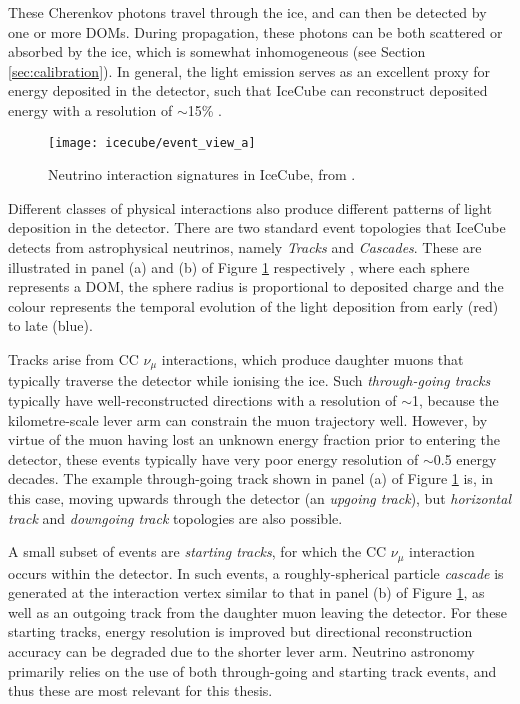 These Cherenkov photons travel through the ice, and can then be detected by one or more DOMs. During propagation, these photons can be both scattered or absorbed by the ice, which is somewhat inhomogeneous (see Section \ref{sec:calibration}). In general, the light emission serves as an excellent proxy for energy deposited in the detector, such that IceCube can reconstruct deposited energy with a resolution of $\sim$15\% . 

\begin{figure}
	\centering \texttt{[image: icecube/event\_view\_a]}
	\caption{Neutrino interaction signatures in IceCube, from \cite{kintscher_thesis}.}
	\label{fig:event_views}
\end{figure}

Different classes of physical interactions also produce different patterns of light deposition in the detector. There are two standard event topologies that IceCube detects from astrophysical neutrinos, namely \emph{Tracks} and \emph{Cascades}. These are illustrated in panel (a) and (b) of Figure \ref{fig:event_views} respectively , where each sphere represents a DOM, the sphere radius is proportional to deposited charge and the colour represents the temporal evolution of the light deposition from early (red) to late (blue). 

Tracks arise from CC $\nu_{\mu}$ interactions, which produce daughter muons that typically traverse the detector while ionising the ice. Such \emph{through-going tracks} typically have well-reconstructed directions with a resolution of $\sim$1\arcdeg, because the kilometre-scale lever arm can constrain the muon trajectory well. However, by virtue of the muon having lost an unknown energy fraction prior to entering the detector, these events typically have very poor energy resolution of $\sim$0.5 energy decades. The example through-going track shown in panel (a) of Figure \ref{fig:event_views} is, in this case, moving upwards through the detector (an \emph{upgoing track}), but \emph{horizontal track} and \emph{downgoing track} topologies are also possible. 

A small subset of events are \emph{starting tracks}, for which the CC $\nu_{\mu}$ interaction occurs within the detector. In such events, a roughly-spherical particle \emph{cascade} is generated at the interaction vertex similar to that in panel (b) of Figure \ref{fig:event_views}, as well as an outgoing track from the daughter muon leaving the detector. For these starting tracks, energy resolution is improved but directional reconstruction accuracy can be degraded due to the shorter lever arm. Neutrino astronomy primarily relies on the use of both through-going and starting track events, and thus these are most relevant for this thesis. 

